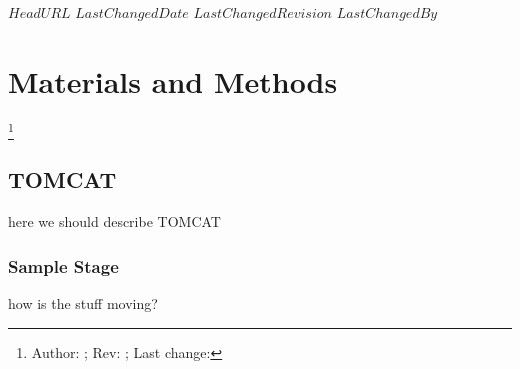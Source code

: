 \svnidlong
{$HeadURL$}
{$LastChangedDate$}
{$LastChangedRevision$}
{$LastChangedBy$}
\section{Materials and Methods}
\footnote{Author: \svnauthor; Rev: \svnrev; Last change: \svndate}%
\subsection{TOMCAT}
here we should describe TOMCAT
\subsubsection{Sample Stage}
how is the stuff moving?
